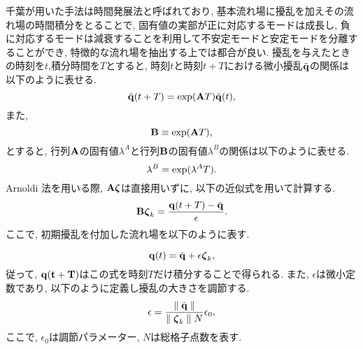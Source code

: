 千葉が用いた手法は時間発展法\cite{theofilis2}と呼ばれており,
基本流れ場に擾乱を加えその流れ場の時間積分をとることで,
固有値の実部が正に対応するモードは成長し,
負に対応するモードは減衰することを利用して不安定モードと安定モードを分離することができ,
特徴的な流れ場を抽出する上では都合が良い.
擾乱を与えたときの時刻を$t$,積分時間を$T$とすると,
時刻$t$と時刻$t+T$における微小擾乱$\tilde{\bf q}$の関係は以下のように表せる.
\begin{equation}
  \tilde{\bf q}(t+T) = {\rm exp}({\bf A}T)\tilde{\bf q}(t),
\label{timeintg}%
\end{equation}
また,
\begin{equation}
   {\bf B} \equiv {\rm exp}({\bf A} T),
\label{intgB}
\end{equation}
とすると,
行列${\bf A}$の固有値$\lambda^A$と行列${\bf B}$の固有値$\lambda^B$の関係は以下のように表せる.
\begin{equation}
   \lambda^B= {\rm exp}(\lambda^A T).
   \label{tab:lamdab}
\end{equation}
Arnoldi 法を用いる際,
${\bf A}{\boldsymbol \zeta}$は直接用いずに,
以下の近似式を用いて計算する.
\begin{equation}
  {\bf B}{\mbox {\boldmath $\zeta$}}_{k} = \frac{{\bf q}(t+T)-\bar{\bf q}}{\epsilon}.
\label{timeappr}
\end{equation}
ここで,
初期擾乱を付加した流れ場を以下のように表す.

\begin{equation}
{\bf q}(t)={\bar {\bf q}}+\epsilon{\boldsymbol \zeta}_k,
\end{equation}
従って,
${\bf q(t+T)}$はこの式を時刻$T$だけ積分することで得られる.
また,
$\epsilon$は微小定数であり,
以下のように定義し擾乱の大きさを調節する.
\begin{equation}
  \epsilon = \frac{\parallel \bar{\bf q} \parallel}{\parallel {\mbox {\boldmath $\zeta$}}_{k} \parallel N} \epsilon_{0},
\label{ep}
\end{equation}
ここで,
$\epsilon_{0}$は調節パラメーター,
$N$は総格子点数を表す.

